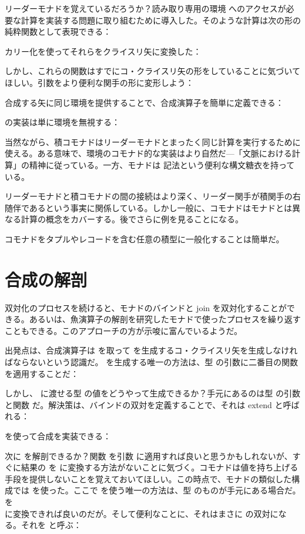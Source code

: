 リーダーモナドを覚えているだろうか？読み取り専用の環境  へのアクセスが必要な計算を実装する問題に取り組むために導入した。そのような計算は次の形の純粋関数として表現できる：

カリー化を使ってそれらをクライスリ矢に変換した：

しかし、これらの関数はすでにコ・クライスリ矢の形をしていることに気づいてほしい。引数をより便利な関手の形に変形しよう：

合成する矢に同じ環境を提供することで、合成演算子を簡単に定義できる：

 の実装は単に環境を無視する：

当然ながら、積コモナドはリーダーモナドとまったく同じ計算を実行するために使える。ある意味で、環境のコモナド的な実装はより自然だ---「文脈における計算」の精神に従っている。一方、モナドは  記法という便利な構文糖衣を持っている。

リーダーモナドと積コモナドの間の接続はより深く、リーダー関手が積関手の右随伴であるという事実に関係している。しかし一般に、コモナドはモナドとは異なる計算の概念をカバーする。後でさらに例を見ることになる。

 コモナドをタプルやレコードを含む任意の積型に一般化することは簡単だ。

\section{合成の解剖}

双対化のプロセスを続けると、モナドのバインドと join を双対化することができる。あるいは、魚演算子の解剖を研究したモナドで使ったプロセスを繰り返すこともできる。このアプローチの方が示唆に富んでいるようだ。

出発点は、合成演算子は  を取って  を生成するコ・クライスリ矢を生成しなければならないという認識だ。 を生成する唯一の方法は、型  の引数に二番目の関数を適用することだ：

しかし、 に渡せる型  の値をどうやって生成できるか？手元にあるのは型  の引数と関数  だ。解決策は、バインドの双対を定義することで、それは extend と呼ばれる：

 を使って合成を実装できる：

次に  を解剖できるか？関数  を引数  に適用すれば良いと思うかもしれないが、すぐに結果の  を  に変換する方法がないことに気づく。コモナドは値を持ち上げる手段を提供しないことを覚えておいてほしい。この時点で、モナドの類似した構成では  を使った。ここで  を使う唯一の方法は、型  のものが手元にある場合だ。 を\\  に変換できれば良いのだが。そして便利なことに、それはまさに  の双対になる。それを  と呼ぶ：


